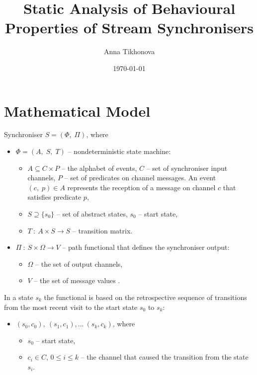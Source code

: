 \documentclass{article}
\begin{document}
\author{Anna Tikhonova}
\title{Static Analysis of Behavioural Properties of Stream Synchronisers}
\date{\today}
\maketitle
\tableofcontents


\section{Mathematical Model}
Synchroniser $S = (\Phi, \; \Pi)$, where
  \begin{itemize}
  \item[] $\Phi = (A, \; S, \; T)$ -- nondeterministic state machine:
    \begin{itemize}
    \item[] $A \subseteq C \times P$ -- the alphabet of events, $C$ -- set of synchroniser input channels, $P$ -- set of predicates on channel messages. An event $(c, \; p) \in A$ represents the reception of a message on channel $c$ that satisfies predicate $p$,
    \item[] $S \supseteq \{s_{0}\}$ -- set of abstract states, $s_{0}$ -- start state,
    \item[] $T \: : \: A \times S \to S$ -- transition matrix.
    \end{itemize}
  \item[] $\Pi \: : \: S \times \Omega \to V$ -- path functional that defines the synchroniser output:
    \begin{itemize}
    \item[] $\Omega$ -- the set of output channels,
    \item[] $V$ -- the set of message values \cite{astrakahn}.
    \end{itemize}
  \end{itemize}

In a state $s_{k}$ the functional is based on the retrospective sequence of transitions from the most recent visit to the start state $s_{0}$ to $s_{k}$:
  \begin{itemize}
  \item[] $(s_{0}, c_{0}), \: (s_{1}, c_{1}),... \: (s_{k}, c_{k})$, where
    \begin{itemize}
      \item[] $s_{0}$ -- start state,
      \item[] $c_{i} \in C$, $0 \le i \le k$ -- the channel that caused the transition from the state $s_{i}$.
    \end{itemize}
  \end{itemize}
\end{document}
